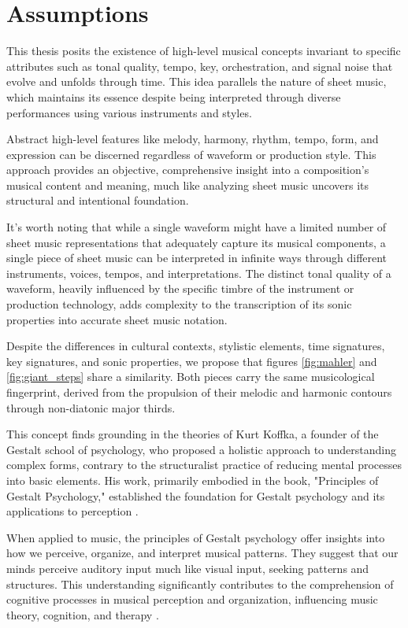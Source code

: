 \section{Assumptions}

This thesis posits the existence of high-level musical concepts invariant to specific attributes such as tonal quality, tempo, key, orchestration, and signal noise that evolve and unfolds through time. This idea parallels the nature of sheet music, which maintains its essence despite being interpreted through diverse performances using various instruments and styles.

Abstract high-level features like melody, harmony, rhythm, tempo, form, and expression can be discerned regardless of waveform or production style. This approach provides an objective, comprehensive insight into a composition's musical content and meaning, much like analyzing sheet music uncovers its structural and intentional foundation.

It's worth noting that while a single waveform might have a limited number of sheet music representations that adequately capture its musical components, a single piece of sheet music can be interpreted in infinite ways through different instruments, voices, tempos, and interpretations. The distinct tonal quality of a waveform, heavily influenced by the specific timbre of the instrument or production technology, adds complexity to the transcription of its sonic properties into accurate sheet music notation.

Despite the differences in cultural contexts, stylistic elements, time signatures, key signatures, and sonic properties, we propose that figures \ref{fig:mahler} and \ref{fig:giant_steps} share a similarity. Both pieces carry the same musicological fingerprint, derived from the propulsion of their melodic and harmonic contours through non-diatonic major thirds.

This concept finds grounding in the theories of Kurt Koffka, a founder of the Gestalt school of psychology, who proposed a holistic approach to understanding complex forms, contrary to the structuralist practice of reducing mental processes into basic elements. His work, primarily embodied in the book, "Principles of Gestalt Psychology," established the foundation for Gestalt psychology and its applications to perception \cite{Koffka2013PrinciplesPsychology}.

When applied to music, the principles of Gestalt psychology offer insights into how we perceive, organize, and interpret musical patterns. They suggest that our minds perceive auditory input much like visual input, seeking patterns and structures. This understanding significantly contributes to the comprehension of cognitive processes in musical perception and organization, influencing music theory, cognition, and therapy \cite{Lerdahl1985AMusic}.

